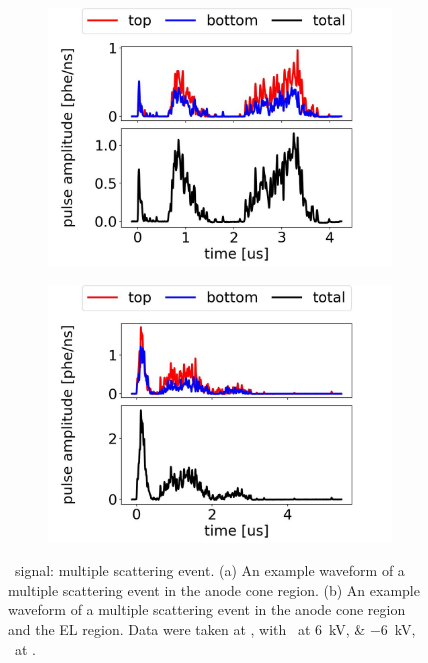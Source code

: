 \begin{figure}[!htbp]
	\centering
	\begin{subfigure}[b]{0.7\textwidth}
		\centering
		\includegraphics[width=\figurewidth,clip,trim={0 0 0 0}]{Figures/GasTest/exampleWaveforms/proc64767id00000054.jpg}
		\caption{}
		\label{fig:}
	\end{subfigure}
\par\bigskip
	\begin{subfigure}[b]{0.7\textwidth}
	\centering
	\includegraphics[width=\figurewidth,clip,trim={0 0 0 0}]{Figures/GasTest/exampleWaveforms/proc64767id00000083.jpg}
	\caption{}
	\label{fig:}
\end{subfigure}
	\caption[\gtest\ signal: multiple scattering event.]{\gtest\ signal: multiple scattering event. (a) An example waveform of a multiple scattering event in the anode cone region. (b) An example waveform of a multiple scattering event in the anode cone region and the EL region. Data were taken at , with \opvtvb\ at \SIlist{+6;-6}{kV}, \opgd\ at \standarddensity .%
	}
	\label{fig:multi scatter}
\end{figure}


